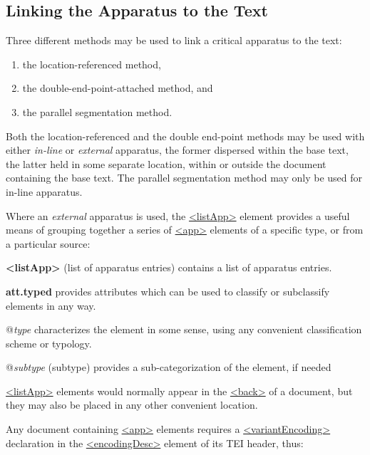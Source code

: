 \subsection[{Linking the Apparatus to the Text}]{Linking the Apparatus to the Text}\label{TCAPLK}\par
Three different methods may be used to link a critical apparatus to the text: \begin{enumerate}
\item the location-referenced method,
\item the double-end-point-attached method, and
\item the parallel segmentation method.
\end{enumerate}\par
Both the location-referenced and the double end-point methods may be used with either \textit{in-line} or \textit{external} apparatus, the former dispersed within the base text, the latter held in some separate location, within or outside the document containing the base text. The parallel segmentation method may only be used for in-line apparatus.\par
Where an \textit{external} apparatus is used, the \hyperref[TEI.listApp]{<listApp>} element provides a useful means of grouping together a series of \hyperref[TEI.app]{<app>} elements of a specific type, or from a particular source: 
\begin{sansreflist}
  
\item [\textbf{<listApp>}] (list of apparatus entries) contains a list of apparatus entries.
\item [\textbf{att.typed}] provides attributes which can be used to classify or subclassify elements in any way.\hfil\\[-10pt]\begin{sansreflist}
    \item[@{\itshape type}]
  characterizes the element in some sense, using any convenient classification scheme or typology.
    \item[@{\itshape subtype}]
  (subtype) provides a sub-categorization of the element, if needed
\end{sansreflist}  
\end{sansreflist}
 \hyperref[TEI.listApp]{<listApp>} elements would normally appear in the \hyperref[TEI.back]{<back>} of a document, but they may also be placed in any other convenient location.\par
Any document containing \hyperref[TEI.app]{<app>} elements requires a \hyperref[TEI.variantEncoding]{<variantEncoding>} declaration in the \hyperref[TEI.encodingDesc]{<encodingDesc>} element of its TEI header, thus: 
